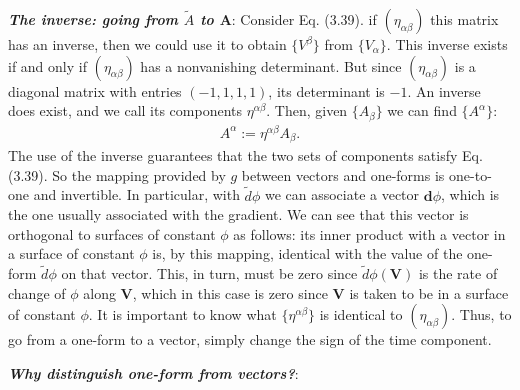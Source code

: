 \documentclass[11pt,letterpaper]{book}
\begin{document}
    \textit{\textbf{The inverse: going from $\tilde{A}$ to $\mathbf{A}$}}: Consider Eq. (3.39). if \((\eta_{\alpha\beta})\) this matrix has an inverse, then we could use it to obtain \(\{V^\beta\}\) from \(\{V_\alpha\}\). This inverse exists if and only if \((\eta_{\alpha\beta})\) has a nonvanishing determinant. But since \((\eta_{\alpha\beta})\) is a diagonal matrix with entries \((-1, 1, 1, 1)\), its determinant is \(-1\). An inverse does exist, and we call its components \(\eta^{\alpha\beta}\). Then, given \(\{A_\beta\}\) we can find \(\{A^\alpha\}\):
    \begin{align}
    A^\alpha := \eta^{\alpha\beta}A_\beta. \tag{3.43}
    \end{align}
    The use of the inverse guarantees that the two sets of components satisfy Eq. (3.39). So the mapping provided by \(g\) between vectors and one-forms is one-to-one and invertible. 
    In particular, with \(\tilde{d}\phi\) we can associate a vector \(\mathbf{d}\phi\), which is the one usually associated with the gradient. We can see that this vector is orthogonal to surfaces of constant \(\phi\) as follows: its inner product with a vector in a surface of constant \(\phi\) is, by this mapping, identical with the value of the one-form \(\tilde{d}\phi\) on that vector. This, in turn, must be zero since \(\tilde{d}\phi(\mathbf{V})\) is the rate of change of \(\phi\) along \(\mathbf{V}\), which in this case is zero since \(\mathbf{V}\) is taken to be in a surface of constant \(\phi\).
    It is important to know what \(\{\eta^{\alpha\beta}\}\) is identical to \((\eta_{\alpha\beta})\). Thus, to go from a one-form to a vector, simply change the sign of the time component.
    
    \textit{\textbf{Why distinguish one-form from vectors?}}: 
    
\end{document}
